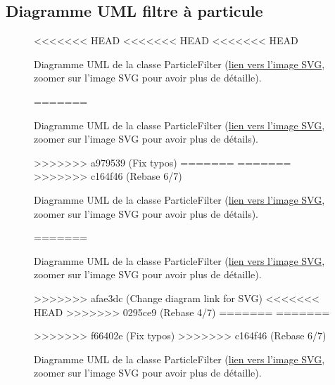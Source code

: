 \begin{appendices}
\section*{Diagramme UML filtre à particule}\label{app:UMLParticleFilter}
\begin{figure}[!htbp]
	\center
<<<<<<< HEAD
<<<<<<< HEAD
<<<<<<< HEAD
	\caption{Diagramme UML de la classe ParticleFilter (\href{https://raw.githubusercontent.com/gabriel-combe/Cuttlefish_Tracker/main/rapport/UML/particlefilter.svg}{lien vers l'image SVG}, zoomer sur l'image SVG pour avoir plus de détaille).}
=======
	\caption{Diagramme UML de la classe ParticleFilter (\href{https://raw.githubusercontent.com/gabriel-combe/Cuttlefish_Tracker/main/rapport/UML/particlefilter.svg}{lien vers l'image SVG}, zoomer sur l'image SVG pour avoir plus de détails).}
>>>>>>> a979539 (Fix typos)
=======
=======
>>>>>>> c164f46 (Rebase 6/7)
	\caption{Diagramme UML de la classe ParticleFilter (\href{https://raw.githubusercontent.com/gabriel-combe/Cuttlefish_Tracker/main/rapport/UML/particlefilter.svg}{lien vers l'image SVG}, zoomer sur l'image SVG pour avoir plus de détails).}
=======
	\caption{Diagramme UML de la classe ParticleFilter (\href{https://raw.githubusercontent.com/gabriel-combe/Cuttlefish_Tracker/test/rapport/UML/particlefilter.svg}{lien vers l'image SVG}, zoomer sur l'image SVG pour avoir plus de détaille).}
>>>>>>> afae3dc (Change diagram link for SVG)
<<<<<<< HEAD
>>>>>>> 0295ce9 (Rebase 4/7)
=======
=======
	\caption{Diagramme UML de la classe ParticleFilter (\href{https://raw.githubusercontent.com/gabriel-combe/Cuttlefish_Tracker/main/rapport/UML/particlefilter.svg}{lien vers l'image SVG}, zoomer sur l'image SVG pour avoir plus de détaille).}
>>>>>>> f66402e (Fix typos)
>>>>>>> c164f46 (Rebase 6/7)
	\label{fig:uml_diagram_particlefilter}
\end{figure}
\FloatBarrier
	
	
\clearpage

\end{appendices}
